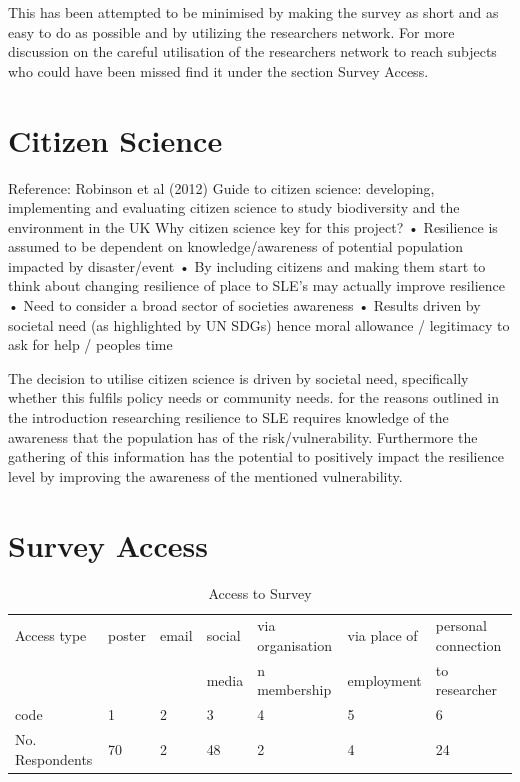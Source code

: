This has been attempted to be minimised by making the survey as short and as easy to do as possible and by utilizing the researchers network. For more discussion on the careful utilisation of the researchers network to reach subjects who could have been missed find it under the section Survey Access. 

\section{Citizen Science}
Reference: Robinson et al (2012) Guide to citizen science: developing, implementing and evaluating citizen science to study biodiversity and the environment in the UK 
Why citizen science key for this project?
•	Resilience is assumed to be dependent on knowledge/awareness of potential population impacted by disaster/event
•	By including citizens and making them start to think about changing resilience of place to SLE’s may actually improve resilience
•	Need to consider a broad sector of societies awareness
•	Results driven by societal need (as highlighted by UN SDGs) hence moral allowance / legitimacy to ask for help / peoples time

The decision to utilise citizen science is driven by societal need, specifically whether this fulfils policy needs or community needs. for the reasons outlined in the introduction researching resilience to SLE requires knowledge of the awareness that the population has of the risk/vulnerability. Furthermore the gathering of this information has the potential to positively impact the resilience level by improving the awareness of the mentioned vulnerability. 

\section{Survey Access}

\begin{table}[!ht]
    \centering
    \begin{tabular}{|l|l|l|l|l|l|l|}
    \hline
     Access type & poster & email & social & via organisation  & via place of  & personal connection \\ \newline
       &  & & media & n membership & employment & to researcher \\ \hline
       code & 1 & 2 & 3 & 4 & 5 & 6 \\ \hline
      No. Respondents & 70 & 2 & 48 & 2 & 4 & 24 \\ \hline
    \end{tabular}
      \caption{Access to Survey}
      \label{access_survey}
\end{table}

